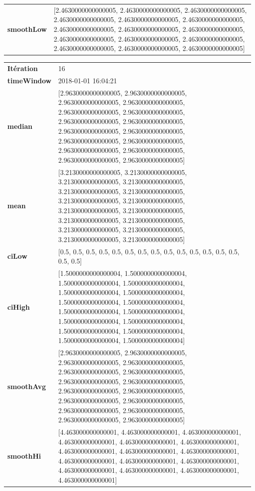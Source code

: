 \begin{table}[H]
	\centering
	\begin{tabularx}{\textwidth}{lX}
		\textbf{smoothLow} & [2.4630000000000005, 2.4630000000000005, 2.4630000000000005, 2.4630000000000005, 2.4630000000000005, 2.4630000000000005, 2.4630000000000005, 2.4630000000000005, 2.4630000000000005, 2.4630000000000005, 2.4630000000000005, 2.4630000000000005, 2.4630000000000005, 2.4630000000000005, 2.4630000000000005]
		\\ 
	\end{tabularx} 
\end{table}
\begin{table}[H]
	\centering
	\begin{tabularx}{\textwidth}{lX}
		\textbf{Itération}&16 \\
		\textbf{timeWindow}	 & 2018-01-01 16:04:21   \\
		\textbf{median} & [2.9630000000000005, 2.9630000000000005, 2.9630000000000005, 2.9630000000000005, 2.9630000000000005, 2.9630000000000005, 2.9630000000000005, 2.9630000000000005, 2.9630000000000005, 2.9630000000000005, 2.9630000000000005, 2.9630000000000005, 2.9630000000000005, 2.9630000000000005, 2.9630000000000005, 2.9630000000000005] 
		\\ 
		\textbf{mean} & [3.2130000000000005, 3.2130000000000005, 3.2130000000000005, 3.2130000000000005, 3.2130000000000005, 3.2130000000000005, 3.2130000000000005, 3.2130000000000005, 3.2130000000000005, 3.2130000000000005, 3.2130000000000005, 3.2130000000000005, 3.2130000000000005, 3.2130000000000005, 3.2130000000000005, 3.2130000000000005] 
		\\
		\textbf{ciLow} & [0.5, 0.5, 0.5, 0.5, 0.5, 0.5, 0.5, 0.5, 0.5, 0.5, 0.5, 0.5, 0.5, 0.5, 0.5, 0.5] 
		\\
		\textbf{ciHigh}& [1.5000000000000004, 1.5000000000000004, 1.5000000000000004, 1.5000000000000004, 1.5000000000000004, 1.5000000000000004, 1.5000000000000004, 1.5000000000000004, 1.5000000000000004, 1.5000000000000004, 1.5000000000000004, 1.5000000000000004, 1.5000000000000004, 1.5000000000000004, 1.5000000000000004, 1.5000000000000004] 
		\\
		\textbf{smoothAvg} &[2.9630000000000005, 2.9630000000000005, 2.9630000000000005, 2.9630000000000005, 2.9630000000000005, 2.9630000000000005, 2.9630000000000005, 2.9630000000000005, 2.9630000000000005, 2.9630000000000005, 2.9630000000000005, 2.9630000000000005, 2.9630000000000005, 2.9630000000000005, 2.9630000000000005, 2.9630000000000005] 
		\\
		\textbf{smoothHi} & [4.463000000000001, 4.463000000000001, 4.463000000000001, 4.463000000000001, 4.463000000000001, 4.463000000000001, 4.463000000000001, 4.463000000000001, 4.463000000000001, 4.463000000000001, 4.463000000000001, 4.463000000000001, 4.463000000000001, 4.463000000000001, 4.463000000000001, 4.463000000000001] 
		\\
			\end{tabularx} 
		\end{table}
		
